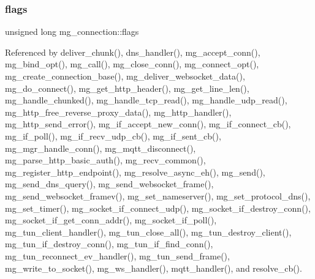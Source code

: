 \mbox{\label{structmg__connection_aa47edda11152dd7769a76d806a87e1aa_aa47edda11152dd7769a76d806a87e1aa}} 
\subsubsection{\texorpdfstring{flags}{flags}}
{\footnotesize\ttfamily unsigned long mg\+\_\+connection\+::flags}



Referenced by deliver\+\_\+chunk(), dns\+\_\+handler(), mg\+\_\+accept\+\_\+conn(), mg\+\_\+bind\+\_\+opt(), mg\+\_\+call(), mg\+\_\+close\+\_\+conn(), mg\+\_\+connect\+\_\+opt(), mg\+\_\+create\+\_\+connection\+\_\+base(), mg\+\_\+deliver\+\_\+websocket\+\_\+data(), mg\+\_\+do\+\_\+connect(), mg\+\_\+get\+\_\+http\+\_\+header(), mg\+\_\+get\+\_\+line\+\_\+len(), mg\+\_\+handle\+\_\+chunked(), mg\+\_\+handle\+\_\+tcp\+\_\+read(), mg\+\_\+handle\+\_\+udp\+\_\+read(), mg\+\_\+http\+\_\+free\+\_\+reverse\+\_\+proxy\+\_\+data(), mg\+\_\+http\+\_\+handler(), mg\+\_\+http\+\_\+send\+\_\+error(), mg\+\_\+if\+\_\+accept\+\_\+new\+\_\+conn(), mg\+\_\+if\+\_\+connect\+\_\+cb(), mg\+\_\+if\+\_\+poll(), mg\+\_\+if\+\_\+recv\+\_\+udp\+\_\+cb(), mg\+\_\+if\+\_\+sent\+\_\+cb(), mg\+\_\+mgr\+\_\+handle\+\_\+conn(), mg\+\_\+mqtt\+\_\+disconnect(), mg\+\_\+parse\+\_\+http\+\_\+basic\+\_\+auth(), mg\+\_\+recv\+\_\+common(), mg\+\_\+register\+\_\+http\+\_\+endpoint(), mg\+\_\+resolve\+\_\+async\+\_\+eh(), mg\+\_\+send(), mg\+\_\+send\+\_\+dns\+\_\+query(), mg\+\_\+send\+\_\+websocket\+\_\+frame(), mg\+\_\+send\+\_\+websocket\+\_\+framev(), mg\+\_\+set\+\_\+nameserver(), mg\+\_\+set\+\_\+protocol\+\_\+dns(), mg\+\_\+set\+\_\+timer(), mg\+\_\+socket\+\_\+if\+\_\+connect\+\_\+udp(), mg\+\_\+socket\+\_\+if\+\_\+destroy\+\_\+conn(), mg\+\_\+socket\+\_\+if\+\_\+get\+\_\+conn\+\_\+addr(), mg\+\_\+socket\+\_\+if\+\_\+poll(), mg\+\_\+tun\+\_\+client\+\_\+handler(), mg\+\_\+tun\+\_\+close\+\_\+all(), mg\+\_\+tun\+\_\+destroy\+\_\+client(), mg\+\_\+tun\+\_\+if\+\_\+destroy\+\_\+conn(), mg\+\_\+tun\+\_\+if\+\_\+find\+\_\+conn(), mg\+\_\+tun\+\_\+reconnect\+\_\+ev\+\_\+handler(), mg\+\_\+tun\+\_\+send\+\_\+frame(), mg\+\_\+write\+\_\+to\+\_\+socket(), mg\+\_\+ws\+\_\+handler(), mqtt\+\_\+handler(), and resolve\+\_\+cb().

\mbox{\label{structmg__connection_a1f14bd154357c301cce137c9ac1d1edb_a1f14bd154357c301cce137c9ac1d1edb}} 
